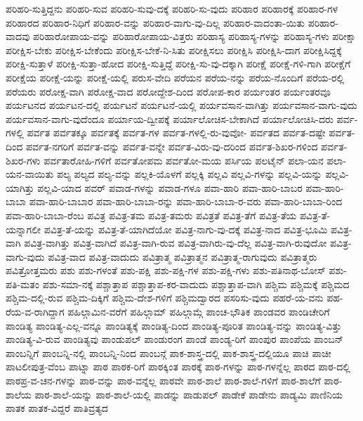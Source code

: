 {ಪರಿಹರಿ-ಸುತ್ತಿದ್ದನು
ಪರಿಹರಿ-ಸುವ
ಪರಿಹರಿ-ಸುವು-ದಕ್ಕೆ
ಪರಿಹರಿ-ಸು-ವುದು
ಪರಿಹಾರ
ಪರಿಹಾರಕ್ಕೆ
ಪರಿಹಾರ-ಗಳ
ಪರಿಹಾರದ
ಪರಿಹಾರ-ನಿಧಿಗೆ
ಪರಿಹಾರ-ವನ್ನು
ಪರಿಹಾರ-ವಾಗು-ವು-ದಿಲ್ಲ
ಪರಿಹಾರ-ವಾದಂತಾ-ಯಿತು
ಪರಿಹಾರ-ವಾದವು
ಪರಿಹಾರೋಪಾಯ-ವನ್ನು
ಪರಿಹಾರೋಪಾಯ-ವಿತ್ತರು
ಪರಿಹಾಸ್ಯ
ಪರಿಹಾಸ್ಯ-ಗಳನ್ನು
ಪರಿಹಾಸ್ಯ-ಗಳು
ಪರೀಕ್ಷಾ
ಪರೀಕ್ಷಿಸ-ಬೇಕು
ಪರೀಕ್ಷಿಸ-ಬೇಕೆಂದು
ಪರೀಕ್ಷಿಸ-ಬೇಕೆ-ನಿ-ಸಿತು
ಪರೀಕ್ಷಿಸಲು
ಪರೀಕ್ಷಿಸಿ
ಪರೀಕ್ಷಿಸಿ-ದಾಗ
ಪರೀಕ್ಷಿಸಿದ್ದಕ್ಕೆ
ಪರೀಕ್ಷಿ-ಸುತ್ತಾಳೆ
ಪರೀಕ್ಷಿ-ಸುತ್ತಾ-ಹೋದ
ಪರೀಕ್ಷಿ-ಸುತ್ತಿದ್ದೆ
ಪರೀಕ್ಷಿ-ಸು-ವು-ದಕ್ಕಾಗಿ
ಪರೀಕ್ಷೆ
ಪರೀಕ್ಷೆ-ಗಳಿ-ಗಾಗಿ
ಪರೀಕ್ಷೆಗೆ
ಪರೀಕ್ಷೆಯ
ಪರೀಕ್ಷೆ-ಯನ್ನು
ಪರೀಕ್ಷೆ-ಯಲ್ಲಿ
ಪರುಸ-ವೇದಿ
ಪರೆಯನ
ಪರೆಯ-ನನ್ನು
ಪರೆಯ-ನೊಂದಿಗೆ
ಪರೆಯ-ರಲ್ಲಿ
ಪರೆಯರು
ಪರೋಕ್ಷ-ವಾಗಿ
ಪರೋಕ್ಷ-ವಾದ
ಪರೋದ್ದೇಶ-ದಿಂದ
ಪರೋಪ-ಕಾರ
ಪರ್ಯಂತರ
ಪರ್ಯಂತರವೂ
ಪರ್ಯಟನದ
ಪರ್ಯಟನ-ದಲ್ಲಿ
ಪರ್ಯಟನೆ
ಪರ್ಯಟನೆ-ಯಲ್ಲಿ
ಪರ್ಯವಸಾನ-ವಾಗಿತ್ತು
ಪರ್ಯವಸಾನ-ವಾಗು-ವುದು
ಪರ್ಯವಸಾನ-ವಾಗು-ವುದೆಂದೂ
ಪರ್ಯಾಯ-ದ್ವೀಪಕ್ಕೆ
ಪರ್ಯಾಲೋಚಿಸ-ಬೇಕಾಗಿದೆ
ಪರ್ಯಾಲೋಚಿಸಿ-ದರು
ಪರ್ವ-ಗಳಲ್ಲಿ
ಪರ್ವತ
ಪರ್ವತಕ್ಕೂ
ಪರ್ವತಕ್ಕೆ
ಪರ್ವತ-ಗಳ
ಪರ್ವತ-ಗಳಲ್ಲಿ-ರು-ವುವೋ-
ಪರ್ವತದ
ಪರ್ವತ-ದಷ್ಟೇ
ಪರ್ವತ-ದಿಂದ
ಪರ್ವತ-ನಗರಿಗೆ
ಪರ್ವತ-ವನ್ನು
ಪರ್ವತ-ವನ್ನೇ
ಪರ್ವತ-ವಿರು-ವು-ದರಿಂದ
ಪರ್ವತ-ಶಿಖರ-ಗಳಿಂದ
ಪರ್ವತ-ಶಿಖರ-ಗಳು
ಪರ್ವತಾರೋಹಿ-ಗಳಿಗೆ
ಪರ್ವತೋಪಮ
ಪರ್ವತೋ-ಮಯ
ಪರ್ಸಿಯ
ಪಲಟೈನ್
ಪಲಾ-ಯನ
ಪಲಾ-ಯನ-ವಾಯಿತು
ಪಲ್ಯ
ಪಲ್ಯದ
ಪಲ್ಯ-ವನ್ನು
ಪಲ್ಲಕಿ-ಯೊಳಗೆ
ಪಲ್ಲಕ್ಕಿ
ಪಲ್ಲವಿ
ಪಲ್ಲವಿ-ಗಳನ್ನು
ಪಲ್ಲವಿ-ಯನ್ನು
ಪಲ್ಲವಿ-ಯಾಗಿತ್ತು
ಪಲ್ಲವಿ-ಯಾದ
ಪವರ್
ಪವಾಡ-ಗಳನ್ನು
ಪವಾಡ-ಗಳೂ
ಪವಾ-ಹಾರಿ
ಪವಾ-ಹಾರಿ-ಬಾಬರ
ಪವಾ-ಹಾರಿ-ಬಾಬಾ
ಪವಾ-ಹಾರಿ-ಬಾಬಾರ
ಪವಾ-ಹಾರಿ-ಬಾಬಾ-ರನ್ನು
ಪವಾ-ಹಾರಿ-ಬಾಬಾ-ರ-ವರು
ಪವಾ-ಹಾರಿ-ಬಾಬಾ-ರಿಂದ
ಪವಾ-ಹಾರಿ-ಬಾಬಾ-ರೆಂಬ
ಪವಿತ್ರ
ಪವಿತ್ರ-ತಮ
ಪವಿತ್ರ-ತಮರು
ಪವಿತ್ರತೆ
ಪವಿತ್ರ-ತೆಗೆ
ಪವಿತ್ರ-ತೆಯ
ಪವಿತ್ರ-ತೆ-ಯನ್ನಾಗಲೀ
ಪವಿತ್ರ-ತೆ-ಯನ್ನು
ಪವಿತ್ರ-ತೆ-ಯಾಗಿದೆಯೋ
ಪವಿತ್ರ-ನಾಗು-ವು-ದಕ್ಕೆ
ಪವಿತ್ರ-ನಾದ
ಪವಿತ್ರ-ಭೂಮಿ
ಪವಿತ್ರ-ವಾಗಿ
ಪವಿತ್ರ-ವಾಗಿತ್ತು
ಪವಿತ್ರ-ವಾಗಿದೆ
ಪವಿತ್ರ-ವಾಗಿ-ರುವ
ಪವಿತ್ರ-ವಾಗಿರು-ವು-ದೆಲ್ಲ
ಪವಿತ್ರ-ವಾಗಿ-ರುವುದೋ
ಪವಿತ್ರ-ವಾಗು-ವುದು
ಪವಿತ್ರ-ವಾದ
ಪವಿತ್ರ-ವಾದುದು
ಪವಿತ್ರಾತ್ಮ
ಪವಿತ್ರಾತ್ಮನ
ಪವಿತ್ರಾತ್ಮ-ರಾಗುವುದು
ಪವಿತ್ರಾತ್ಮರು
ಪವಿತ್ರೋತ್ತಮರು
ಪಶು
ಪಶು-ಗಳಂತೆ
ಪಶು-ಪಕ್ಷಿ
ಪಶು-ಪಕ್ಷಿ-ಗಳ
ಪಶು-ಪಕ್ಷಿ-ಗಳು
ಪಶು-ಪತಿನಾಥ-ಬೋಸ್
ಪಶು-ಪತಿ-ಮತಂ
ಪಶು-ಸಮಾ-ನಕ್ಕೆ
ಪಶ್ಚಾತ್ತಾಪ
ಪಶ್ಚಾತ್ತಾಪ-ಕರ-ವಾದುದು
ಪಶ್ಚಾತ್ತಾಪ-ವಾಗಿ
ಪಶ್ಚಿಮ
ಪಶ್ಚಿಮಕ್ಕೆ
ಪಶ್ಚಿಮದ
ಪಶ್ಚಿಮ-ದಲ್ಲಿ-ರುವ
ಪಶ್ಚಿಮ-ದಿಕ್ಕಿಗೆ
ಪಶ್ಚಿಮ-ದೇಶ-ಗಳಿಗೆ
ಪಶ್ಚಿಮದ್ವಾರದ
ಪಸರಿಸು-ವುದು
ಪಹರೆ-ಯ-ವನು
ಪಹ-ರೆಯ-ವ-ರಾಗಿದ್ದಾಗ
ಪಹಿಲ್ಗಾಮಿನ-ವರೆಗೆ
ಪಹಿಲ್ಗಾಮ್
ಪಹಿಲ್ಗಾಮ್ಗೆ
ಪಾಂಚ-ಭೌತಿಕ
ಪಾಂಡವರ
ಪಾಂಡಿಚೇರಿಗೆ
ಪಾಂಡಿತ್ಯ
ಪಾಂಡಿತ್ಯ-ಎಲ್ಲ-ವನ್ನೂ
ಪಾಂಡಿತ್ಯಕ್ಕೆ
ಪಾಂಡಿತ್ಯ-ದಿಂದ
ಪಾಂಡಿತ್ಯ-ಪೂರಿತ
ಪಾಂಡಿತ್ಯ-ವನ್ನು
ಪಾಂಡಿತ್ಯ-ವಿತ್ತು
ಪಾಂಡಿತ್ಯ-ವಿ-ರುವ
ಪಾಂಡಿತ್ಯವು
ಪಾಂಡುಪಲ್
ಪಾಂಡುರಂಗ
ಪಾಂಡೆ
ಪಾಂಡ್ಯ-ರಿಗೆ
ಪಾಂಪುರ
ಪಾಂಪೆಯ
ಪಾಂಬನ್
ಪಾಂಬನ್ನಿಗೆ
ಪಾಂಬನ್ನಿ-ನಲ್ಲಿ
ಪಾಂಬನ್ನಿ-ನಿಂದ
ಪಾಂಬನ್ಗೆ
ಪಾಕ-ಶಾಸ್ತ್ರ-ದಲ್ಲಿ
ಪಾಕ-ಶಾಸ್ತ್ರ-ದಲ್ಲಿಯೂ
ಪಾಚಿ
ಪಾಚೀ
ಪಾಟಲೀಪುತ್ರ-ವೆಂಬ
ಪಾಟ್ನಾ
ಪಾಠ
ಪಾಠಕ-ರಿಗೆ
ಪಾಠಕ್ಕಿಂತ
ಪಾಠಕ್ಕೆ
ಪಾಠ-ಗಳನ್ನು
ಪಾಠ-ಗಳನ್ನೆಲ್ಲ
ಪಾಠದ
ಪಾಠ-ದಲ್ಲಿ
ಪಾಠಪ್ರ-ವ-ಚನ-ಗಳನ್ನು
ಪಾಠ-ವನ್ನು
ಪಾಠ-ವನ್ನೆಲ್ಲ
ಪಾಠವೇ
ಪಾಠ-ಶಾಲೆ
ಪಾಠ-ಶಾಲೆ-ಗಳಿಗೆ
ಪಾಠ-ಶಾಲೆಗೆ
ಪಾಠ-ಶಾಲೆಯ
ಪಾಠ-ಶಾಲೆ-ಯನ್ನು
ಪಾಠ-ಶಾಲೆ-ಯಲ್ಲಿ
ಪಾಡನ್ನು
ಪಾಡುಪಲ್
ಪಾಡೇಕೆ
ಪಾಡೇನು
ಪಾಡ್ಯಮಿ
ಪಾಣಿನಿಯ
ಪಾತಕ
ಪಾತಕ-ವಿದ್ದರೆ
ಪಾತಿವ್ರತ್ಯದ
}
